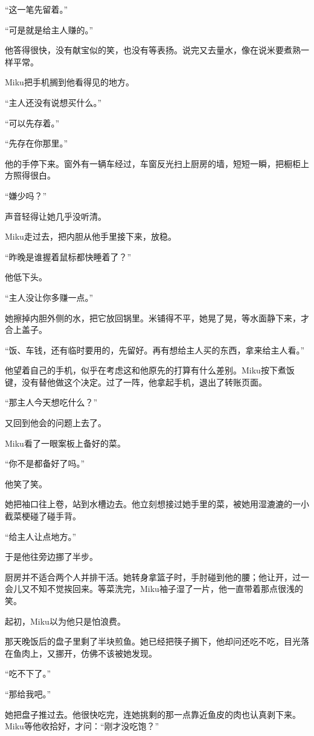 “这一笔先留着。”

“可是就是给主人赚的。”

他答得很快，没有献宝似的笑，也没有等表扬。说完又去量水，像在说米要煮熟一样平常。

Miku把手机搁到他看得见的地方。

“主人还没有说想买什么。”

“可以先存着。”

“先存在你那里。”

他的手停下来。窗外有一辆车经过，车窗反光扫上厨房的墙，短短一瞬，把橱柜上方照得很白。

“嫌少吗？”

声音轻得让她几乎没听清。

Miku走过去，把内胆从他手里接下来，放稳。

“昨晚是谁握着鼠标都快睡着了？”

他低下头。

“主人没让你多赚一点。”

她擦掉内胆外侧的水，把它放回锅里。米铺得不平，她晃了晃，等水面静下来，才合上盖子。

“饭、车钱，还有临时要用的，先留好。再有想给主人买的东西，拿来给主人看。”

他望着自己的手机，似乎在考虑这和他原先的打算有什么差别。Miku按下煮饭键，没有替他做这个决定。过了一阵，他拿起手机，退出了转账页面。

“那主人今天想吃什么？”

又回到他会的问题上去了。

Miku看了一眼案板上备好的菜。

“你不是都备好了吗。”

他笑了笑。

她把袖口往上卷，站到水槽边去。他立刻想接过她手里的菜，被她用湿漉漉的一小截菜梗碰了碰手背。

“给主人让点地方。”

于是他往旁边挪了半步。

厨房并不适合两个人并排干活。她转身拿篮子时，手肘碰到他的腰；他让开，过一会儿又不知不觉挨回来。等菜洗完，Miku袖子湿了一片，他一直带着那点很浅的笑。

\SceneBreak

起初，Miku以为他只是怕浪费。

那天晚饭后的盘子里剩了半块煎鱼。她已经把筷子搁下，他却问还吃不吃，目光落在鱼肉上，又挪开，仿佛不该被她发现。

“吃不下了。”

“那给我吧。”

她把盘子推过去。他很快吃完，连她挑剩的那一点靠近鱼皮的肉也认真剥下来。Miku等他收拾好，才问：“刚才没吃饱？”

